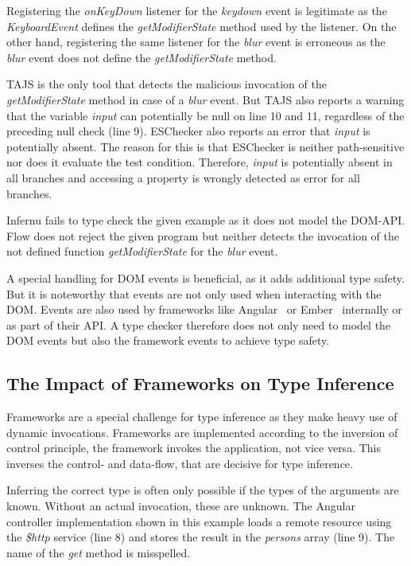 
Registering the \textit{onKeyDown} listener for the \textit{keydown} event is legitimate as the \textit{KeyboardEvent} defines the \textit{getModifierState} method used by the listener. On the other hand, registering the same listener for the \textit{blur} event is erroneous as the \textit{blur} event does not define the \textit{getModifierState} method. 

TAJS is the only tool that detects the malicious invocation of the \textit{getModifierState} method in case of a \textit{blur} event. But TAJS also reports a warning that the variable \textit{input} can potentially be null on line 10 and 11, regardless of the preceding null check (line 9). ESChecker also reports an error that \textit{input} is potentially absent. The reason for this is that ESChecker is neither path-sensitive nor does it evaluate the test condition. Therefore, \textit{input} is potentially absent in all branches and accessing a property is wrongly detected as error for all branches.

Infernu fails to type check the given example as it does not model the DOM-API. Flow does not reject the given program but neither detects the invocation of the not defined function \textit{getModifierState} for the \textit{blur} event. 

A special handling for DOM events is beneficial, as it adds additional type safety. But it is noteworthy that events are not only used when interacting with the DOM. Events are also used by frameworks like Angular~\cite{Angular} or Ember~\cite{Ember} internally or as part of their API. A type checker therefore does not only need to model the DOM events but also the framework events to achieve type safety.

\subsection{The Impact of Frameworks on Type Inference}
Frameworks are a special challenge for type inference as they make heavy use of dynamic invocations.  Frameworks are implemented according to the inversion of control principle, the framework invokes the application, not vice versa. This inverses the control- and data-flow, that are decisive for type inference. 

Inferring the correct type is often only possible if the types of the arguments are known. Without an actual invocation, these are unknown. The Angular~\cite{Angular} controller implementation shown in this example loads a remote resource using the \textit{\$http} service (line 8) and stores the result in the \textit{persons} array (line 9). The name of the \textit{get} method is misspelled. 


